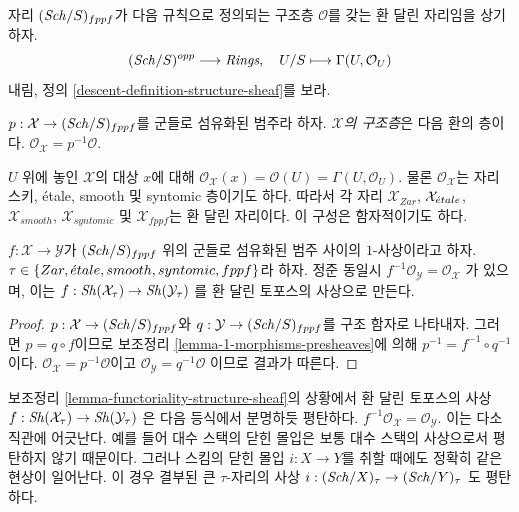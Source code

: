 \medskip\noindent
자리 $(\mathit{Sch}/S)_{fppf}$가 다음 규칙으로 정의되는 구조층
$\mathcal{O}$를 갖는 환 달린 자리임을 상기하자.
$$
(\mathit{Sch}/S)^{opp} \longrightarrow \textit{Rings},
\quad
U/S \longmapsto \Gamma(U, \mathcal{O}_U)
$$
내림, 정의 \ref{descent-definition-structure-sheaf}를 보라.

\begin{definition}
\label{definition-structure-sheaf}
$p : \mathcal{X} \to (\mathit{Sch}/S)_{fppf}$를 군들로 섬유화된 범주라 하자.
{\it $\mathcal{X}$의 구조층}은 다음 환의 층이다.
$\mathcal{O}_\mathcal{X} = p^{-1}\mathcal{O}$.
\end{definition}

\noindent
$U$ 위에 놓인 $\mathcal{X}$의 대상 $x$에 대해
$\mathcal{O}_\mathcal{X}(x) = \mathcal{O}(U) = \Gamma(U, \mathcal{O}_U)$.
물론 $\mathcal{O}_\mathcal{X}$는 자리스키, \'etale, smooth 및
syntomic 층이기도 하다. 따라서 각 자리
$\mathcal{X}_{Zar}$, $\mathcal{X}_{\acute{e}tale}$, $\mathcal{X}_{smooth}$,
$\mathcal{X}_{syntomic}$ 및 $\mathcal{X}_{fppf}$는 환 달린 자리이다.
이 구성은 함자적이기도 하다.

\begin{lemma}
\label{lemma-functoriality-structure-sheaf}
$f : \mathcal{X} \to \mathcal{Y}$가 $(\mathit{Sch}/S)_{fppf}$ 위의 군들로
섬유화된 범주 사이의 $1$-사상이라고 하자.
$\tau \in \{Zar, {\acute{e}tale}, smooth, syntomic, fppf\}$라 하자.
정준 동일시
$f^{-1}\mathcal{O}_\mathcal{Y} = \mathcal{O}_\mathcal{X}$
가 있으며, 이는
$f : \mathop{\mathit{Sh}}\nolimits(\mathcal{X}_\tau) \to \mathop{\mathit{Sh}}\nolimits(\mathcal{Y}_\tau)$
를 환 달린 토포스의 사상으로 만든다.
\end{lemma}

\begin{proof}
$p : \mathcal{X} \to (\mathit{Sch}/S)_{fppf}$와
$q : \mathcal{Y} \to (\mathit{Sch}/S)_{fppf}$를 구조 함자로 나타내자.
그러면 $p = q \circ f$이므로 보조정리
\ref{lemma-1-morphisms-presheaves}에 의해
$p^{-1} = f^{-1} \circ q^{-1}$이다.
$\mathcal{O}_\mathcal{X} = p^{-1}\mathcal{O}$이고
$\mathcal{O}_\mathcal{Y} = q^{-1}\mathcal{O}$
이므로 결과가 따른다.
\end{proof}

\begin{remark}
\label{remark-flat}
보조정리 \ref{lemma-functoriality-structure-sheaf}의 상황에서
환 달린 토포스의 사상
$f : \mathop{\mathit{Sh}}\nolimits(\mathcal{X}_\tau) \to \mathop{\mathit{Sh}}\nolimits(\mathcal{Y}_\tau)$
은 다음 등식에서 분명하듯 평탄하다.
$f^{-1}\mathcal{O}_\mathcal{X} = \mathcal{O}_\mathcal{Y}$.
이는 다소 직관에 어긋난다. 예를 들어 대수 스택의 닫힌 몰입은 보통
대수 스택의 사상으로서 평탄하지 않기 때문이다. 그러나 스킴의 닫힌
몰입 $i : X \to Y$를 취할 때에도 정확히 같은 현상이 일어난다.
이 경우 결부된 큰 $\tau$-자리의 사상
$i : (\mathit{Sch}/X)_\tau \to (\mathit{Sch}/Y)_\tau$
도 평탄하다.
\end{remark}




